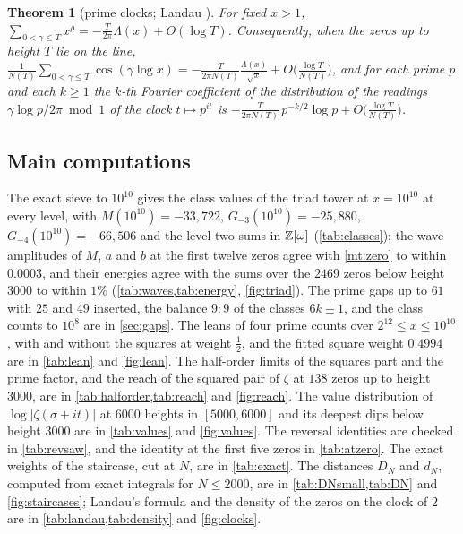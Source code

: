 \documentclass[11pt]{article}
\newtheorem{theorem}{Theorem}[section]
\theoremstyle{definition}\newtheorem{definition}[theorem]{Definition}
\theoremstyle{remark}\newtheorem{remark}[theorem]{Remark}
\theoremstyle{definition}\newtheorem{axiom}{Axiom}
\begin{document}
\begin{theorem}[prime clocks; Landau \cite{Landau12}]\label{mt:clocks}
For fixed $x>1$, $\sum_{0<\gamma\le T}x^\rho=-\frac T{2\pi}\Lambda(x)+O(\log T)$. Consequently, when the zeros up to height $T$ lie on the line, $\frac1{N(T)}\sum_{0<\gamma\le T}\cos(\gamma\log x)=-\frac{T}{2\pi N(T)}\frac{\Lambda(x)}{\sqrt x}+O\bigl(\frac{\log T}{N(T)}\bigr)$, and for each prime $p$ and each $k\ge1$ the $k$-th Fourier coefficient of the distribution of the readings $\gamma\log p/2\pi\bmod1$ of the clock $t\mapsto p^{it}$ is $-\frac{T}{2\pi N(T)}\,p^{-k/2}\log p+O\bigl(\frac{\log T}{N(T)}\bigr)$.
\end{theorem}

\subsection{Main computations}

The exact sieve to $10^{10}$ gives the class values of the triad tower at $x=10^{10}$ at every level, with $M(10^{10})=-33{,}722$, $G_{-3}(10^{10})=-25{,}880$, $G_{-4}(10^{10})=-66{,}506$ and the level-two sums in $\mathbb Z[\omega]$ (\cref{tab:classes}); the wave amplitudes of $M$, $a$ and $b$ at the first twelve zeros agree with \cref{mt:zero} to within $0.0003$, and their energies agree with the sums over the $2469$ zeros below height $3000$ to within $1\%$ (\cref{tab:waves,tab:energy}, \cref{fig:triad}). The prime gaps up to $61$ with $25$ and $49$ inserted, the balance $9:9$ of the classes $6k\pm1$, and the class counts to $10^8$ are in \cref{sec:gaps}. The leans of four prime counts over $2^{12}\le x\le10^{10}$, with and without the squares at weight $\frac12$, and the fitted square weight $0.4994$ are in \cref{tab:lean} and \cref{fig:lean}. The half-order limits of the squares part and the prime factor, and the reach of the squared pair of $\zeta$ at $138$ zeros up to height $3000$, are in \cref{tab:halforder,tab:reach} and \cref{fig:reach}. The value distribution of $\log|\zeta(\sigma+it)|$ at $6000$ heights in $[5000,6000]$ and its deepest dips below height $3000$ are in \cref{tab:values} and \cref{fig:values}. The reversal identities are checked in \cref{tab:revsaw}, and the identity at the first five zeros in \cref{tab:atzero}. The exact weights of the staircase, cut at $N$, are in \cref{tab:exact}. The distances $D_N$ and $d_N$, computed from exact integrals for $N\le2000$, are in \cref{tab:DNsmall,tab:DN} and \cref{fig:staircases}; Landau's formula and the density of the zeros on the clock of $2$ are in \cref{tab:landau,tab:density} and \cref{fig:clocks}.
\end{document}

